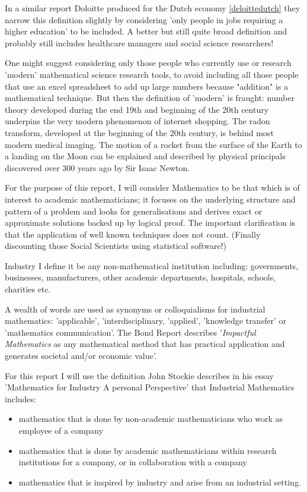 \documentclass[11pt]{article} %
\begin{document}
	
	In a similar report Doloitte produced for the Dutch economy \ref{deloittedutch} they narrow this definition slightly by considering 'only people in jobs requiring a higher education' to be included.  A better but still quite broad definition and probably still includes healthcare managers and social science researchers!
	
	
	One might suggest considering only those people who currently use or research 'modern' mathematical science research tools, to avoid including all those people that use an excel spreadsheet to add up large numbers because "addition" is a mathematical technique. But then the definition of 'modern' is fraught: number theory developed during the end 19th and beginning of the 20th century underpins the very modern phenomenon of internet shopping. The radon transform, developed at the beginning of the 20th century, is behind most modern medical imaging. The motion of a rocket from the surface of the Earth to a landing on the Moon can be explained and described by physical principals discovered over 300 years ago by Sir Isaac Newton.
	
	
	For the purpose of this report, I  will consider Mathematics to be that which is of interest to academic mathematicians; it focuses  on the underlying structure and pattern of a problem and  looks for generalisations and derives exact or approximate solutions backed up by logical proof. The important clarification is that the application of well known techniques does not count. (Finally discounting those Social Scientists using statistical software!)
	
	
 Industry  I define it be any non-mathematical institution including: governments, businesses, manufacturers, other academic departments, hospitals, schools, charities etc. 


		A wealth of words are used as synonyms or colloquialisms for industrial mathematics: 'applicable', 'interdisciplinary, 'applied', 'knowledge transfer' or 'mathematics communication'. The Bond Report \cite{Bond} describes '\textit{Impactful Mathematics} as any mathematical method that has practical application and generates societal and/or economic value'. 
		
		For this report I will use the definition John Stockie describes in his essay 'Mathematics for Industry A personal Perspective' \cite{Stockie2015} that Industrial Mathematics includes: 
		
	\begin{itemize}
	\item mathematics that is done by non-academic mathematicians who work as employee of a company
	\item mathematics that is done by academic mathematicians within research institutions for a company, or in collaboration with a company
	\item mathematics that is inspired by industry and arise from an industrial setting. 
	\end{itemize}
	
\end{document}
